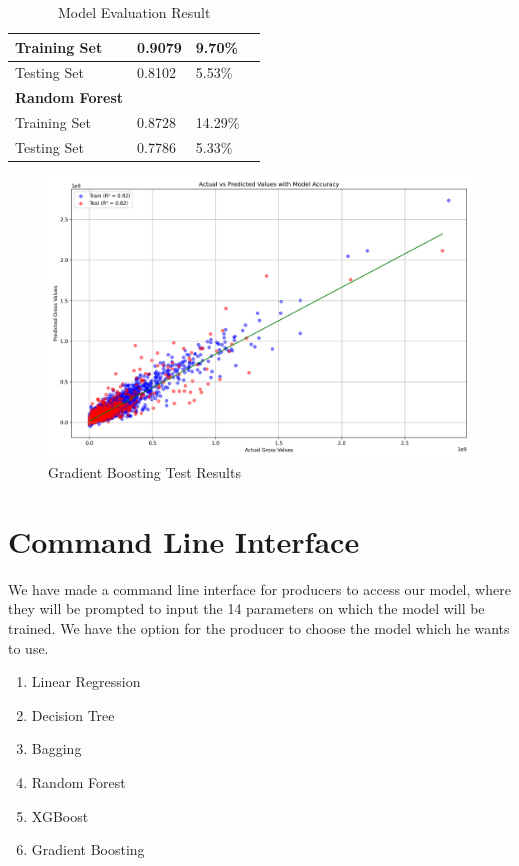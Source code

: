 \documentclass[conference]{IEEEtran}
\begin{document}
\begin{table}[h]
\begin{tabular}{
            | p{}
            | p{} 
            | p{} |
            | p{}
            }
            \hline
            Training Set & 0.9079 & 9.70\% \\
            \hline
            Testing Set & 0.8102 & 5.53\%\\
            \hline
            \multicolumn{1}{|l}{\textbf{Random Forest}}\\
            \hline
            Training Set & 0.8728 & 14.29\% \\
            \hline
            Testing Set & 0.7786 & 5.33\% \\
            \hline
        \end{tabular}
    \caption{Model Evaluation Result}
    \end{table}
    
    \begin{figure}[h]
        \centering
        \includegraphics[width=1\linewidth]{model_accuracy_plot.png}
        \caption{Gradient Boosting Test Results}
        \label{fig:gradient_boosting_test}
    \end{figure}

\section{Command Line Interface}
    We have made a command line interface for producers to access our model, where they will be prompted to input the 14 parameters on which the model will be trained.
    We have the option for the producer to choose the model which he wants to use.
    \begin{enumerate}
        \item Linear Regression
        \item Decision Tree
        \item Bagging
        \item Random Forest
        \item XGBoost
        \item Gradient Boosting
    \end{enumerate}
\end{document}
